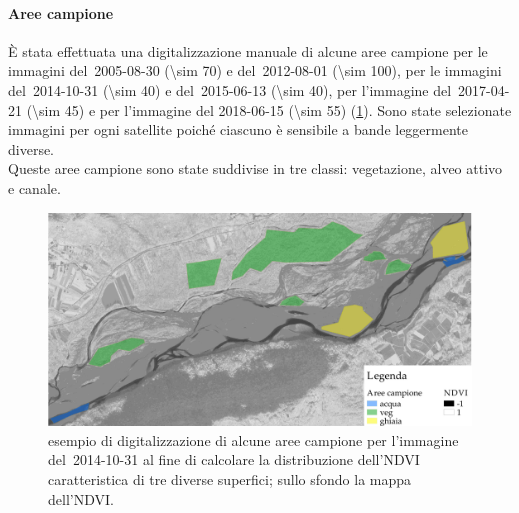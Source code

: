 \paragraph{Aree campione}
\`{E} stata effettuata una digitalizzazione manuale di alcune aree campione per le immagini \AST{} del~2005-08-30 (\num{\sim 70}) e del~2012-08-01 (\num{\sim 100}), per le immagini \Pl{} del~2014-10-31 (\num{\sim 40}) e del~2015-06-13 (\num{\sim 40}), per l'immagine \Se{} del~2017-04-21 (\num{\sim 45}) e per l'immagine \WV{} del 2018-06-15 (\num{\sim 55}) (\cref{fig:esempio-aree-campione}).
	Sono state selezionate immagini per ogni satellite poiché ciascuno è sensibile a bande leggermente diverse. 
	\\
	Queste aree campione sono state suddivise in tre classi: vegetazione, alveo attivo e canale.
	\begin{figure}[ht]
		\centering
		\includegraphics[width=\textwidth]{files/esempio_aree_campione_2014_10_31.jpeg}
		\caption[esempio di aree campione per calcolare la distribuzione dell'NDVI]{esempio di digitalizzazione di alcune aree campione per l'immagine \Pl{} del~2014-10-31 al fine di calcolare la distribuzione dell'NDVI caratteristica di tre diverse superfici; sullo sfondo la mappa dell'NDVI.}
		\label{fig:esempio-aree-campione}
	\end{figure}

